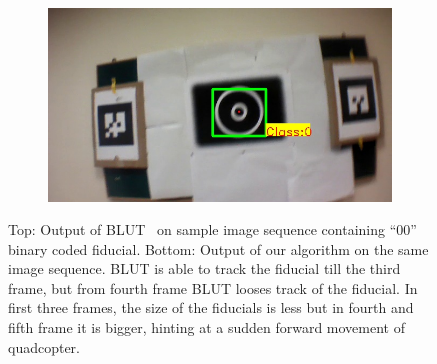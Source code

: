 \documentclass[runningheads]{llncs}
\begin{document}
\begin{figure}
\begin{subfigure}[b]{.19\textwidth}
\end{subfigure}
\begin{subfigure}[b]{.19\textwidth}
\includegraphics[width=\linewidth]{BLUT_input_00/output6.jpg}
\end{subfigure}
\caption{Top: Output of BLUT~\cite{Wu:2011} on sample image sequence containing ``00''
binary coded fiducial. Bottom: Output of our algorithm on the same image
sequence. BLUT is able to track the fiducial till the third frame, but from fourth
frame BLUT looses track of the fiducial. In first three frames, the size of the
fiducials is less but in fourth and fifth frame it is bigger, hinting at a sudden
forward movement of quadcopter.}
\label{fig:BLUT_compare_00}
\end{figure}
\end{document}
